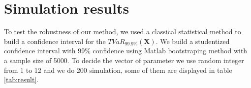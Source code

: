 \documentclass[12pt,travaildirige,nobabel, twoside]{dms}
\numberwithin{equation}{section}
\numberwithin{table}{chapter}
\numberwithin{figure}{chapter}
\begin{document}
\section{Simulation results}

To test the robustness of our method, we used a classical statistical method to build a confidence interval for the $TVaR_{99.9\%}(\textbf{X})$. We build a  studentized confidence interval with 99\% confidence using Matlab bootstraping method with a sample size of 5000. To decide the vector of parameter we use random integer from 1 to 12 and we do 200 simulation, some of them are displayed in table \ref{tab:result}.\\

\hskip-4.0cm
\begin {table}[h]
\caption {$TVaR_{99.9\%}(\textbf{X})$} \label{tab:result} 
\begin{adjustbox}{width=1.1\textwidth}


\end{adjustbox}
\end{table}
\end{document}
